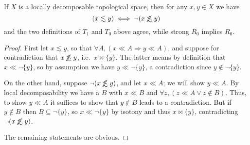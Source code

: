 \documentclass{article}
\def\oapt{\mathrel{\!\not\,\not\lesssim}}
\def\leapx{\lesssim}
\def\cpl#1{\neg #1}
\let\implies\Rightarrow
\def\singleton#1{\{#1\}}
\begin{document}
\begin{thm}\label{thm:ldtop-ord}
  If $X$ is a locally decomposable topological space, then for any $x,y\in X$ we have
  \[ (x\leapx y) \iff \neg(x\oapt y) \]
  and the two definitions of $T_1$ and $T_0$ above agree, while strong $R_0$ implies $R_0$.
\end{thm}
\begin{proof}
  First let $x\leapx y$, so that $\forall A, (x\ll A \implies y\ll A)$, and suppose for contradiction that $x\oapt y$, i.e.\ $x\bowtie \singleton{y}$.
  The latter means by definition that $x\ll \cpl{\singleton{y}}$, so by assumption we have $y\ll \cpl{\singleton{y}}$, a contradiction since $y\notin \cpl{\singleton{y}}$.

  On the other hand, suppose $\neg(x\oapt y)$, and let $x\ll A$; we will show $y\ll A$.
  By local decomposability we have a $B$ with $x\ll B$ and $\forall z, (z\ll A \lor z\notin B)$.
  Thus, to show $y\ll A$ it suffices to show that $y\notin B$ leads to a contradiction.
  But if $y\notin B$ then $B\subseteq \cpl{\singleton{y}}$, so $x\ll \cpl{\singleton{y}}$ by isotony and thus $x\bowtie \singleton{y}$, contradicting $\neg(x\oapt y)$.

  The remaining statements are obvious.
\end{proof}
\end{document}
